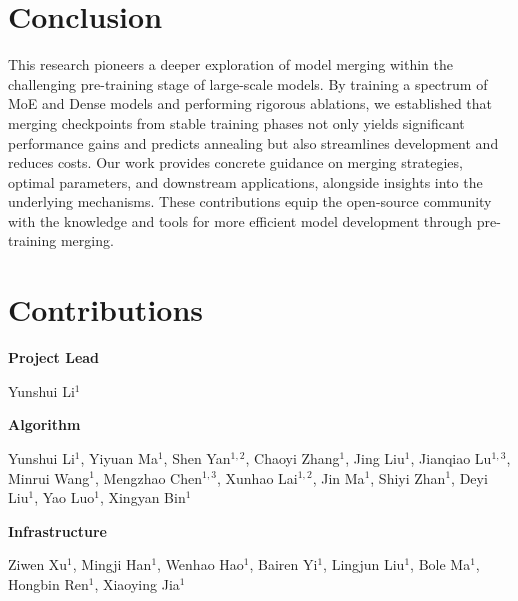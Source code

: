 \section{Conclusion}
This research pioneers a deeper exploration of model merging within the challenging pre-training stage of large-scale models. By training a spectrum of MoE and Dense models and performing rigorous ablations, we established that merging checkpoints from stable training phases not only yields significant performance gains and predicts annealing but also streamlines development and reduces costs. Our work provides concrete guidance on merging strategies, optimal parameters, and downstream applications, alongside insights into the underlying mechanisms. These contributions equip the open-source community with the knowledge and tools for more efficient model development through pre-training merging.

\newpage

\section*{Contributions}
\label{contributions}
\textbf{Project Lead}\quad 

Yunshui Li$^{1}$


\textbf{Algorithm}

Yunshui Li$^{1}$, Yiyuan Ma$^{1}$, Shen Yan$^{1,2}$, Chaoyi Zhang$^{1}$, Jing Liu$^{1}$, Jianqiao Lu$^{1,3}$, Minrui Wang$^{1}$, Mengzhao Chen$^{1,3}$, Xunhao Lai$^{1,2}$, Jin Ma$^{1}$, Shiyi Zhan$^{1}$, Deyi Liu$^{1}$,  Yao Luo$^{1}$, Xingyan Bin$^{1}$


\textbf{Infrastructure}

Ziwen Xu$^{1}$, Mingji Han$^{1}$, Wenhao Hao$^{1}$, Bairen Yi$^{1}$, Lingjun Liu$^{1}$, Bole Ma$^{1}$, Hongbin Ren$^{1}$, Xiaoying Jia$^{1}$



